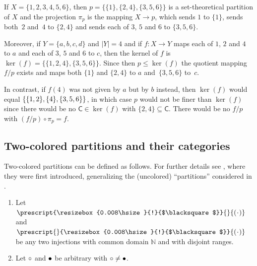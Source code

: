 \documentclass[10pt,a4paper]{amsart}
\numberwithin{equation}{section}
\newcommand{\Scomposition}{\circ}
\newcommand{\pint}{\mathbb{N}}
\newcommand{\xfromto}[3]{#1 \colon  #2 \to #3}
\newcommand{\argph}{\hspace{0.5pt}\cdot\hspace{0.5pt}}
\newcommand{\upp}[1]{\prescript{\resizebox{0.008\hsize}{!}{$\blacksquare$}}{}{#1}}
\newcommand{\lop}[1]{\prescript{}{\resizebox{0.008\hsize}{!}{$\blacksquare$}}{#1}}
\newcommand{\blpoint}{\mathnormal{\bullet}}
\newcommand{\whpoint}{\mathnormal{\circ}}
\newcommand{\finerthan}{\mathrel{\leq}}
\newcommand{\Yb}[1]{\mathsf{#1}}
\newcommand{\blofun}[1]{\pi_{#1}}
\newcommand{\kerp}[1]{\ker(#1)}
\newcommand{\tsquomap}[2]{#1 / #2}
\begin{document}
\begin{Example}
      \newcommand{\themap}{f}
      \newcommand{\domset}{X}
      \newcommand{\codset}{Y}
      \newcommand{\thepartition}{p}
      \newcommand{\othermap}{g}
      \newcommand{\block}{\Yb{C}}
      If $\domset=\{1,2,3,4,5,6\}$, then $\thepartition=\{\{1\},\{2,4\},\{3,5,6\}\}$ is a set-theoretical partition of $\domset$ and the projection $\blofun{\thepartition}$ is the mapping $\domset\to \thepartition$, which sends $1$ to $\{1\}$, sends both~$2$ and~$4$ to $\{2,4\}$ and sends each of $3$, $5$ and $6$ to $\{3,5,6\}$.

      Moreover, if  $\codset=\{a,b,c,d\}$ and $|\codset|=4$ and if $\xfromto{\themap}{\domset}{\codset}$ maps each of $1$, $2$ and $4$ to $a$ and each of $3$, $5$ and $6$ to $c$, then the kernel of $\themap$ is $\kerp{\themap}=\{\{1,2,4\},\{3,5,6\}\}$. Since then $\thepartition\finerthan\kerp{\themap}$ the quotient mapping $\tsquomap{\themap}{\thepartition}$ exists and maps both  $\{1\}$ and $\{2,4\}$ to $a$ and~$\{3,5,6\}$ to~$c$.

      In contrast, if $\themap(4)$ was not given by $a$ but by $b$ instead, then $\kerp{\themap}$ would equal $\{\{1,2\},\{4\},\break\{3,5,6\}\}$, in which case $\thepartition$ would not be finer than  $\kerp{\themap}$ since there would be no $\block\in\kerp{\themap}$ with $\{2,4\}\subseteq \block$. There would be no $\tsquomap{\themap}{\thepartition}$ with $(\tsquomap{\themap}{\thepartition})\Scomposition\blofun{\thepartition}=\themap$.
\end{Example}

\subsection{Two-colored partitions and their categories}
\label{section:easy-partitions}
Two-co\-lo\-red partitions can be defined as follows. For further details see \cite{TarragoWeber2018}, where they  were first introduced, generalizing the (uncolored) ``partitions'' considered in \cite{BanicaSpeicher2009}.
\begin{Assumptions}\quad
  \begin{enumerate}\itemsep=0pt
  \item Let $\upp{(\argph)}$ and $\lop{(\argph)}$ be any two injections with common domain  $\pint$ and with disjoint ranges.
  \item  Let $\whpoint$ and $\blpoint $ be arbitrary with $\whpoint\neq \blpoint$.
  \end{enumerate}
\end{Assumptions}
\end{document}
